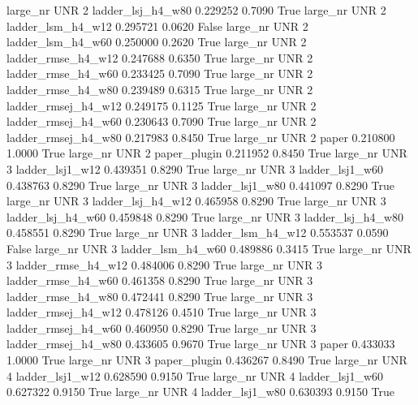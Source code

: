   large_nr      UNR                 2   ladder_lsj_h4_w80   0.229252      0.7090    True
  large_nr      UNR                 2   ladder_lsm_h4_w12   0.295721      0.0620   False
  large_nr      UNR                 2   ladder_lsm_h4_w60   0.250000      0.2620    True
  large_nr      UNR                 2  ladder_rmse_h4_w12   0.247688      0.6350    True
  large_nr      UNR                 2  ladder_rmse_h4_w60   0.233425      0.7090    True
  large_nr      UNR                 2  ladder_rmse_h4_w80   0.239489      0.6315    True
  large_nr      UNR                 2 ladder_rmsej_h4_w12   0.249175      0.1125    True
  large_nr      UNR                 2 ladder_rmsej_h4_w60   0.230643      0.7090    True
  large_nr      UNR                 2 ladder_rmsej_h4_w80   0.217983      0.8450    True
  large_nr      UNR                 2               paper   0.210800      1.0000    True
  large_nr      UNR                 2        paper_plugin   0.211952      0.8450    True
  large_nr      UNR                 3     ladder_lsj1_w12   0.439351      0.8290    True
  large_nr      UNR                 3     ladder_lsj1_w60   0.438763      0.8290    True
  large_nr      UNR                 3     ladder_lsj1_w80   0.441097      0.8290    True
  large_nr      UNR                 3   ladder_lsj_h4_w12   0.465958      0.8290    True
  large_nr      UNR                 3   ladder_lsj_h4_w60   0.459848      0.8290    True
  large_nr      UNR                 3   ladder_lsj_h4_w80   0.458551      0.8290    True
  large_nr      UNR                 3   ladder_lsm_h4_w12   0.553537      0.0590   False
  large_nr      UNR                 3   ladder_lsm_h4_w60   0.489886      0.3415    True
  large_nr      UNR                 3  ladder_rmse_h4_w12   0.484006      0.8290    True
  large_nr      UNR                 3  ladder_rmse_h4_w60   0.461358      0.8290    True
  large_nr      UNR                 3  ladder_rmse_h4_w80   0.472441      0.8290    True
  large_nr      UNR                 3 ladder_rmsej_h4_w12   0.478126      0.4510    True
  large_nr      UNR                 3 ladder_rmsej_h4_w60   0.460950      0.8290    True
  large_nr      UNR                 3 ladder_rmsej_h4_w80   0.433605      0.9670    True
  large_nr      UNR                 3               paper   0.433033      1.0000    True
  large_nr      UNR                 3        paper_plugin   0.436267      0.8490    True
  large_nr      UNR                 4     ladder_lsj1_w12   0.628590      0.9150    True
  large_nr      UNR                 4     ladder_lsj1_w60   0.627322      0.9150    True
  large_nr      UNR                 4     ladder_lsj1_w80   0.630393      0.9150    True
